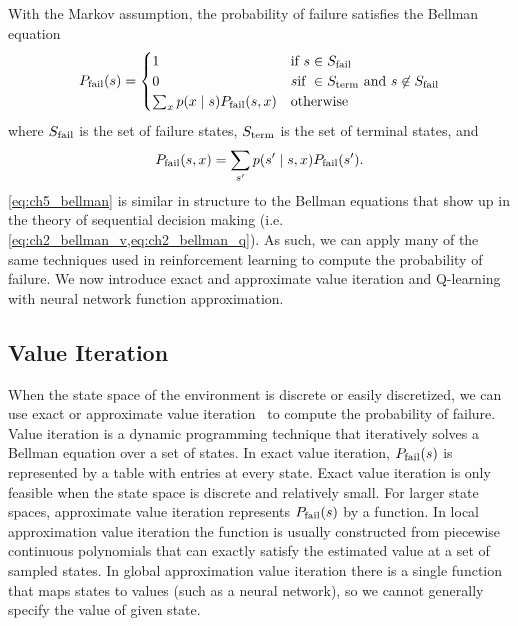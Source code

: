With the Markov assumption, the probability of failure satisfies the Bellman equation
\begin{equation}
    P_{\rm fail}(s) = \begin{cases}
    1 & \text{if } s \in S_{\rm fail} \\
    0 & s \text{if } \in S_{\rm term} \text{ and } s \not \in S_{\rm fail} \\
    \sum_x p(x \mid s) P_{\rm fail}(s, x) & \text{otherwise}
    \end{cases} \label{eq:ch5_bellman}
\end{equation}
where $S_{\rm fail}$ is the set of failure states, $S_{\rm term}$ is the set of terminal states, and
\begin{equation}
    P_{\rm fail}(s, x) = \sum_{s'} p(s' \mid s, x) P_{\rm fail}(s') \text{.}
\end{equation}
\cref{eq:ch5_bellman} is similar in structure to the Bellman equations that show up in the theory of sequential decision making (i.e. \cref{eq:ch2_bellman_v,eq:ch2_bellman_q}). As such, we can apply many of the same techniques used in reinforcement learning to compute the probability of failure. We now introduce exact and approximate value iteration and Q-learning with neural network function approximation. 

\subsection{Value Iteration}

When the state space of the environment is discrete or easily discretized, we can use exact or approximate value iteration~\cite{dmubook} to compute the probability of failure. Value iteration is a dynamic programming technique that iteratively solves a Bellman equation over a set of states. In exact value iteration, $P_{\rm fail}(s)$ is represented by a table with entries at every state. Exact value iteration is only feasible when the state space is discrete and relatively small. For larger state spaces, approximate value iteration represents $P_{\rm fail}(s)$ by a function. In local approximation value iteration the function is usually constructed from piecewise continuous polynomials that can exactly satisfy the estimated value at a set of sampled states. In global approximation value iteration there is a single function that maps states to values (such as a neural network), so we cannot generally specify the value of given state. 


